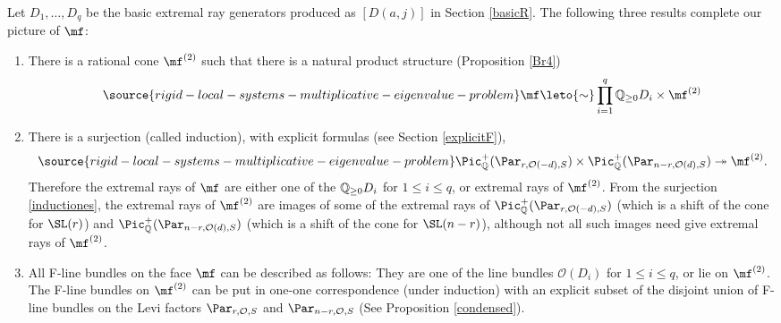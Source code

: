 Let $D_1,\dots,D_q$ be the basic extremal ray generators produced as $[D(a,j)]$ in Section \ref{basicR}. The following three results complete our picture of $\mf$:
\begin{enumerate}
\item[(a)]
 There is a rational cone $\mf^{(2)}$ such that
there is a natural product structure (Proposition \ref{Br4})
\begin{equation}\label{productstructure}
\source{rigid-local-systems-multiplicative-eigenvalue-problem}
\mf\leto{\sim}\prod_{i=1}^q \Bbb{Q}_{\ge 0} D_i \times \mf^{(2)}
\end{equation}
\item[(b)] There is a  surjection (called induction), with explicit formulas (see Section \ref{explicitF}),
\begin{equation}\label{inductiones}
\source{rigid-local-systems-multiplicative-eigenvalue-problem}
\Pic^+_{\Bbb{Q}}(\Par_{r,\mathcal{O}(-d),S})\times \Pic^+_{\Bbb{Q}}(\Par_{n-r,\mathcal{O}(d),S})\twoheadrightarrow \mf^{(2)}.
\end{equation}
Therefore the extremal rays of $\mf$ are either one of the $\Bbb{Q}_{\ge 0} D_i$ for $1\leq i\leq q$, or extremal rays of $\mf^{(2)}$. From the surjection \eqref{inductiones}, the extremal rays of $\mf^{(2)}$ are images of some of the extremal rays of $\Pic^+_{\Bbb{Q}}(\Par_{r,\mathcal{O}(-d),S})$ (which is a shift of the cone for $\SL(r)$) and $\Pic^+_{\Bbb{Q}}(\Par_{n-r,\mathcal{O}(d),S})$ (which is a shift of the cone for $\SL(n-r)$), although not all such images need give extremal rays of $\mf^{(2)}$.
\item[(c)]
All F-line bundles on the face $\mf$ can be described as follows: They are one of the line bundles $\mathcal{O}(D_i)$ for $1\leq i\leq q$, or lie on $\mf^{(2)}$.  The F-line bundles on $\mf^{(2)}$ can be put in one-one correspondence  (under induction)  with an explicit subset of the disjoint union of F-line bundles on the Levi factors $\Par_{r,\mathcal{O},S}$ and $\Par_{n-r,\mathcal{O},S}$ (See Proposition \ref{condensed}).
\end{enumerate}
\iffalse
